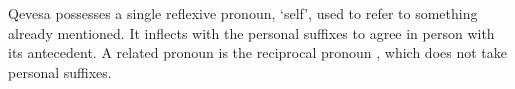 \documentclass[grammar]{subfiles}
\begin{document}

   Qevesa possesses a single reflexive pronoun,  ‘self’, used to
   refer to something already mentioned.  It inflects with the personal
   suffixes to agree in person with its antecedent.  A related pronoun is the
   reciprocal pronoun , which does not take personal suffixes.

\end{document}

